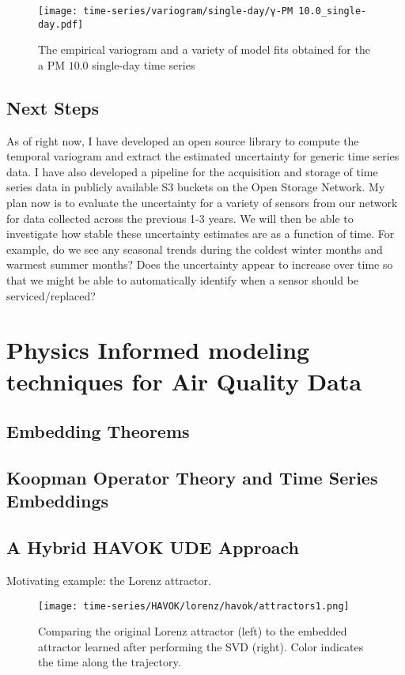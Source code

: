 \begin{figure}[h]
  \centering
  \texttt{[image: time-series/variogram/single-day/γ-PM 10.0\_single-day.pdf]}
  \caption{The empirical variogram and a variety of model fits obtained for the a PM $10.0$ single-day time series}
  \label{fig:pm10-variogram-fits}
\end{figure}

\subsection{Next Steps}

As of right now, I have developed an open source library to compute the temporal variogram and extract the estimated uncertainty for generic time series data. I have also developed a pipeline for the acquisition and storage of time series data in publicly available S3 buckets on the Open Storage Network. My plan now is to evaluate the uncertainty for a variety of sensors from our network for data collected across the previous 1-3 years. We will then be able to investigate how stable these uncertainty estimates are as a function of time. For example, do we see any seasonal trends during the coldest winter months and warmest summer months? Does the uncertainty appear to increase over time so that we might be able to automatically identify when a sensor should be serviced/replaced? 



\section{Physics Informed modeling techniques for Air Quality Data}


\subsection{Embedding Theorems}
\subsection{Koopman Operator Theory and Time Series Embeddings}
\subsection{A Hybrid HAVOK UDE Approach}


Motivating example: the Lorenz attractor.

\begin{figure}[h]
  \centering
  \texttt{[image: time-series/HAVOK/lorenz/havok/attractors1.png]}
  \caption{Comparing the original Lorenz attractor (left) to the embedded attractor learned after performing the SVD (right). Color indicates the time along the trajectory.}
\end{figure}

